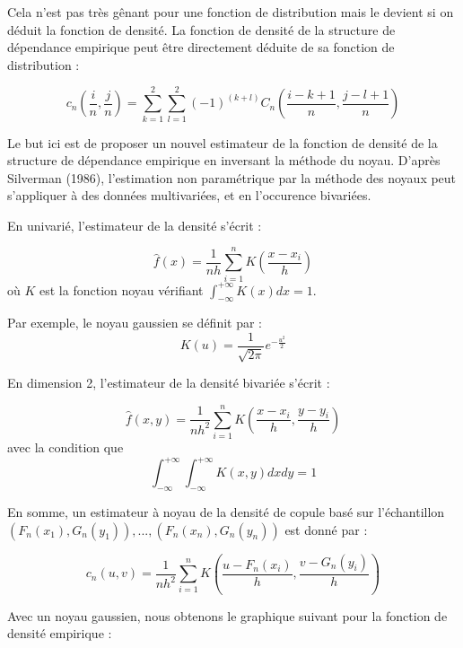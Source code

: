 Cela n'est pas très gênant pour une fonction de distribution mais le devient si on déduit la fonction de densité. La fonction de densité de la structure de dépendance 
empirique peut être directement déduite de sa fonction de distribution :

$$
c_n \left( \frac{i}{n},\frac{j}{n}\right) = \sum_{k=1}^2 \sum_{l=1}^2 (-1)^{(k+l)} C_n \left( \frac{i-k+1}{n},\frac{j-l+1}{n}\right)
$$

Le but ici est de proposer un nouvel estimateur de la fonction de densité de la structure de dépendance empirique en inversant la méthode du noyau.
D'après Silverman (1986), l'estimation non paramétrique par la méthode des noyaux peut s'appliquer à des données multivariées, et en l'occurence bivariées.

En univarié, l'estimateur de la densité s'écrit :

$$
\widehat{f}(x) = \frac{1}{nh} \sum_{i=1}^n K \left( \frac{x - x_i}{h} \right)
$$
où $K$ est la fonction noyau vérifiant $\int_\mathbb{-\infty}^{+\infty} K(x)dx =1$.

Par exemple, le noyau gaussien se définit par :
$$
K(u) = \frac{1}{\sqrt{2 \pi}} e^{-\frac{u^2}{2}}
$$

En dimension 2, l'estimateur de la densité bivariée s'écrit :

$$
\widehat{f}(x,y) = \frac{1}{nh^2} \sum_{i=1}^n K \left(  \frac{x - x_i}{h} , \frac{y-y_i}{h}    \right)
$$
avec la condition que $$ \int_\mathbb{-\infty}^{+\infty}  \int_\mathbb{-\infty}^{+\infty} K(x,y) dx dy = 1$$

En somme, un estimateur à noyau de la densité de copule basé sur l’échantillon $\left(F_n(x_1),G_n(y_1)\right),...,\left(F_n(x_n),G_n(y_n)\right)$ est
donné par :

$$
c_n(u,v) = \frac{1}{nh^2} \sum_{i=1}^n K \left(  \frac{u - F_n(x_i)}{h} , \frac{v-G_n(y_i)}{h}    \right)
$$


Avec un noyau gaussien, nous obtenons le graphique suivant pour la fonction de densité empirique :

